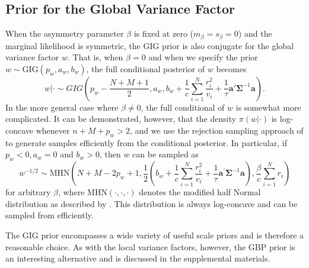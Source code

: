 \documentclass{article} %
\begin{document}
\subsection{Prior for the Global Variance Factor}
When the asymmetry parameter $\beta$ is fixed at zero ($m_\beta = s_\beta = 0$) and the marginal likelihood is symmetric, the GIG prior is also conjugate for the global variance factor $w$. That is, when $\beta = 0$ and when we specify the prior $w \sim \text{GIG}(p_w, a_w, b_w)$, the full conditional posterior of $w$ becomes 
\begin{equation}
    w|\cdot \sim GIG\left(p_w - \frac{N+M+1}{2}, a_w, b_w + \frac{1}{c}\sum_{i=1}^N\frac{r_i^2}{v_i} + \frac{1}{\tau}\bm a'\bm\Sigma^{-1}\bm a\right).
\end{equation}
In the more general case where $\beta \neq 0$, the full conditional of $w$ is somewhat more complicated. It can be demonstrated, however, that the density $\pi(w|\cdot)$ is log-concave whenever $n + M + p_w > 2$, and we use the rejection sampling approach of \citep{devroye2014random} to generate samples efficiently from the conditional posterior. In particular, if $p_w < 0, a_w = 0$ and $b_w > 0$, then $w$ can be sampled as 
\begin{equation}
    w^{-1/2} \sim \text{MHN}\left(N+M-2p_w+1, \frac{1}{2}\left(b_w + \frac{1}{c}\sum_{i=1}^N\frac{r_i^2}{v_i} + \frac{1}{\tau}\bm a^\prime\bm\Sigma^{-1}\bm a\right), \frac{\beta}{c}\sum_{i=1}^Nr_i\right) 
\end{equation}
for arbitrary $\beta$, where MHN$(\cdot, \cdot, \cdot)$ denotes the modified half Normal distribution as described by \cite{sun2021modified}. This distribution is always log-concave and can be sampled from efficiently. 

The GIG prior encompasses a wide variety of useful scale priors and is therefore a reasonable choice. As with the local variance factors, however, the GBP prior is an interesting alternative and is discussed in the supplemental materials.
\end{document}
